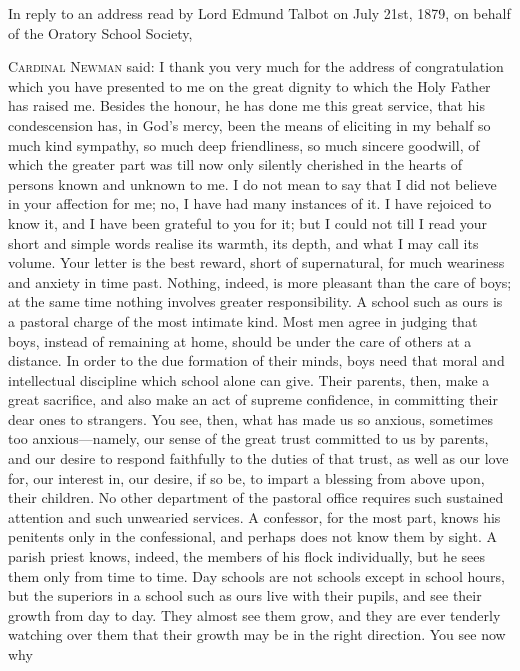 
In reply to an address read by Lord Edmund Talbot
on July 21st, 1879, on behalf of the Oratory School Society,

C\textsc{ardinal} N\textsc{ewman}
said: I thank you very much for the address of congratulation which
you have presented to me on the great dignity to which the Holy Father
has raised me. Besides the honour, he has done me this great service,
that his condescension has, in God's mercy, been the means of
eliciting in my behalf so much kind sympathy, so much deep
friendliness, so much sincere goodwill, of which the greater part was
till now only silently cherished in the hearts of persons known and
unknown to me. I do not mean to say that I did not believe in your
affection for me; no, I have had many instances of it. I have rejoiced
to know it, and I have been grateful to you for it; but I could not
till I read your short and simple words realise its warmth, its depth,
and what I may call its volume. Your letter is the best reward, short
of supernatural, for much weariness and anxiety in time past. Nothing,
indeed, is more pleasant than the care of boys; at the same time
nothing involves greater responsibility. A school such as ours is a
pastoral charge of the most intimate kind. Most men agree in judging
that boys, instead of remaining at home, should be under the care of
others at a distance. In order to the due formation of their minds,
boys need that moral and intellectual discipline which school alone
can give. Their parents, then, make a great sacrifice, and also make
an act of supreme confidence, in committing their dear ones to
strangers. You see, then, what has made us so anxious, sometimes too
anxious—namely, our sense of the great trust committed to us by
parents, and our desire to respond faithfully to the duties of that
trust, as well as our love for, our interest in, our desire, if so be,
to impart a blessing from above upon, their children. No other
department of the pastoral office requires such sustained attention
and such unwearied services. A confessor, for the most part, knows his
penitents only in the confessional, and perhaps does not know
them by sight. A parish priest knows, indeed, the members of his flock
individually, but he sees them only from time to time. Day schools are
not schools except in school hours, but the superiors in a school such
as ours live with their pupils, and see their growth from day to day.
They almost see them grow, and they are ever tenderly watching over
them that their growth may be in the right direction. You see now why
